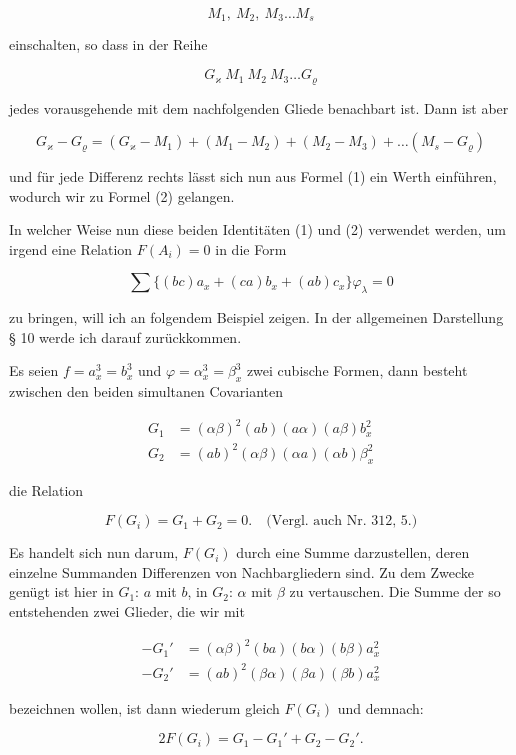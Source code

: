 \documentclass[11pt]{article}
\providecommand{\weberpage}[1]{}
\providecommand{\weq}[2]{\begin{equation}\tag{#1}#2\end{equation}}
\begin{document}
\[ M_1, \ M_2, \ M_3 \ldots M_s \]

einschalten, so dass in der Reihe

\[ G_\varkappa \ M_1 \ M_2 \ M_3 \ldots G_\varrho \]

jedes vorausgehende mit dem nachfolgenden Gliede benachbart ist.
Dann ist aber

\[ G_\varkappa - G_\varrho = (G_\varkappa - M_1) + (M_1 - M_2) + (M_2 - M_3) + \ldots (M_s - G_\varrho) \]

und für jede Differenz rechts lässt sich nun aus Formel (1) ein Werth
einführen, wodurch wir zu Formel (2) gelangen.

In welcher Weise nun diese beiden Identitäten (1) und (2) verwendet
werden, um irgend eine Relation $F(A_i) = 0$ in die Form

\[ \sum \{(bc)a_x + (ca)b_x + (ab)c_x\}\varphi_\lambda = 0 \]

zu bringen, will ich an folgendem Beispiel zeigen. In der allgemeinen
Darstellung § 10 werde ich darauf zurückkommen.

Es seien $f = a_x^3 = b_x^3$ und $\varphi = \alpha_x^3 = \beta_x^3$ zwei cubische Formen,
dann besteht zwischen den beiden simultanen Covarianten

\[
\begin{aligned}
G_1 &{}= (\alpha\beta)^2 (ab)(a\alpha)(a\beta)b_x^2\\
G_2 &{}= (ab)^2 (\alpha\beta)(\alpha a)(\alpha b)\beta_x^2
\end{aligned}
\]

die Relation

\[ F(G_i) = G_1 + G_2 = 0. \quad \text{(Vergl. auch Nr. 312, 5.)} \]

Es handelt sich nun darum, $F(G_i)$ durch eine Summe darzustellen, deren
einzelne Summanden Differenzen von Nachbargliedern sind. Zu dem
Zwecke genügt ist hier in $G_1$: $a$ mit $b$, in $G_2$: $\alpha$ mit $\beta$ zu vertauschen.
Die Summe der so entstehenden zwei Glieder, die wir mit


\weberpage{16}
\[
\begin{aligned}
-G_1' &{}= (\alpha\beta)^2 (ba)(b\alpha)(b\beta)a_x^2\\
-G_2' &{}= (ab)^2 (\beta\alpha)(\beta a)(\beta b)a_x^2
\end{aligned}
\]

bezeichnen wollen, ist dann wiederum gleich $F(G_i)$ und demnach:

\weq{3}{2F(G_i) = G_1 - G_1' + G_2 - G_2'.}
\end{document}
